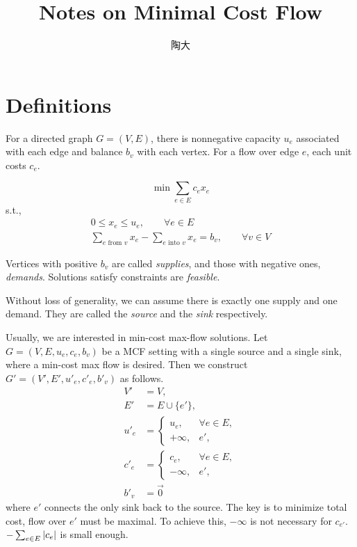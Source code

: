 \documentclass[UTF8,a4paper]{ctexart}
\title{Notes on Minimal Cost Flow}
\author{陶大}
\begin{document}
\maketitle
\tableofcontents

\section{Definitions}

For a directed graph $G=(V, E)$, there is nonnegative capacity $u_e$ associated with each edge
and balance $b_v$ with each vertex.
For a flow over edge $e$, each unit costs $c_e$.

\[
    \min \sum_{e\in E} c_e x_e
\]
s.t.,
\begin{align}
    0\leqslant x_e \leqslant u_e,\qquad \forall e\in E\\
    \sum_{e\text{ from }v} x_e - \sum_{e\text{ into }v} x_e = b_v,\qquad \forall v\in V
\end{align}

Vertices with positive $b_v$ are called \emph{supplies},
and those with negative ones, \emph{demands}.
Solutions satisfy constraints are \emph{feasible}.

Without loss of generality, we can assume there is exactly one supply and one demand.
They are called the \emph{source} and the \emph{sink} respectively.

\begin{remark}
    Usually, we are interested in min-cost max-flow solutions.
    Let $G=(V, E, {u_e}, {c_e}, {b_v})$ be a MCF setting with a single source and a single sink,
    where a min-cost max flow is desired.
    Then we construct $G'=(V', E', {u'_e}, {c'_e}, {b'_v})$ as follows.
    \begin{align}
        V'&=V,\\
        E'&=E\cup\{e'\},\\
        u'_e&=\begin{cases}
            u_e,&\forall e\in E,\\
            +\infty,&e',
        \end{cases}\\
        c'_e&=\begin{cases}
            c_e,&\forall e\in E,\\
            -\infty,&e',
        \end{cases}\\
        b'_v&=\vec{0}
    \end{align}
    where $e'$ connects the only sink back to the source.
    The key is to minimize total cost, flow over $e'$ must be maximal.
    To achieve this, $-\infty$ is not necessary for $c_{e'}$.
    $-\sum_{e\in E}\left| c_e \right|$ is small enough.
\end{remark}
\end{document}
